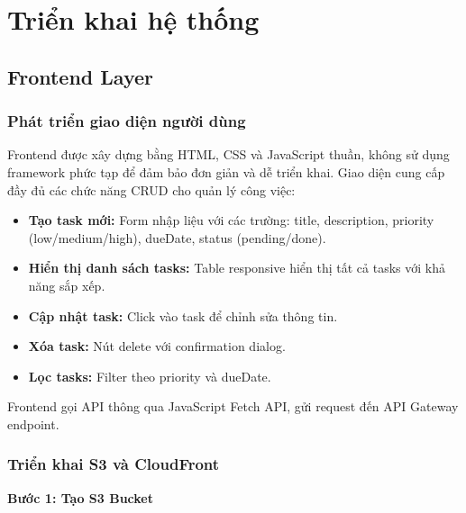 \section{Triển khai hệ thống}
\label{sec:implementation}

\subsection{Frontend Layer}
\label{ssec:frontend_impl}

\subsubsection{Phát triển giao diện người dùng}

Frontend được xây dựng bằng HTML, CSS và JavaScript thuần, không sử dụng framework phức tạp để đảm bảo đơn giản và dễ triển khai. Giao diện cung cấp đầy đủ các chức năng CRUD cho quản lý công việc:

\begin{itemize}
    \item \textbf{Tạo task mới:} Form nhập liệu với các trường: title, description, priority (low/medium/high), dueDate, status (pending/done).
    \item \textbf{Hiển thị danh sách tasks:} Table responsive hiển thị tất cả tasks với khả năng sắp xếp.
    \item \textbf{Cập nhật task:} Click vào task để chỉnh sửa thông tin.
    \item \textbf{Xóa task:} Nút delete với confirmation dialog.
    \item \textbf{Lọc tasks:} Filter theo priority và dueDate.
\end{itemize}

Frontend gọi API thông qua JavaScript Fetch API, gửi request đến API Gateway endpoint.

\subsubsection{Triển khai S3 và CloudFront}

\textbf{Bước 1: Tạo S3 Bucket}

